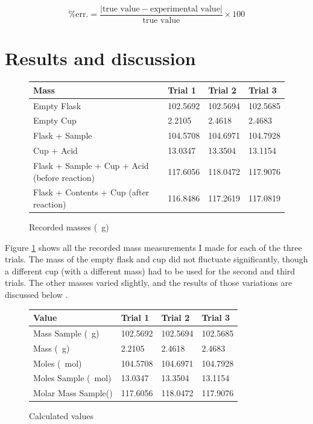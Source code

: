 \documentclass[
journal=aamick,
manuscript=article]{achemso}
\begin{document}
\begin{equation}
  \text{\%err.} =
  \frac{|\text{true value}-\text{experimental value}|}{\text{true value}}
  \times 100
  \label{eq:error}
\end{equation}


\section{Results and discussion}
\begin{figure}
    \begin{tabular}{|l|l|l|l|}
        \hline
	         \textbf{Mass} &  \textbf{Trial 1} &  \textbf{Trial 2} &  \textbf{Trial 3}\\
        \hline
	        Empty Flask & 102.5692 & 102.5694 & 102.5685\\
        \hline
	        Empty Cup & 2.2105 & 2.4618 & 2.4683\\
        \hline
	        Flask + Sample & 104.5708 & 104.6971 & 104.7928\\
        \hline
	        Cup + Acid & 13.0347 & 13.3504 & 13.1154\\
        \hline
	        Flask + Sample + Cup + Acid (before reaction) & 117.6056 & 118.0472 & 117.9076\\
        \hline
	        Flask + Contents + Cup (after reaction) & 116.8486 & 117.2619 & 117.0819\\
        \hline
    \end{tabular}
    \caption{Recorded masses (\SI{}{\gram})}
    \label{tab:data}
\end{figure}

Figure \ref{tab:data} shows all the recorded mass measurements I made for each of the three trials. The mass of the empty flask and cup did not fluctuate significantly, though a different cup (with a different mass) had to be used for the second and third trials. The other masses varied slightly, and the results of those variations are discussed below \cite{k}.

\begin{figure}
    \begin{tabular}{|l|l|l|l|}
        \hline
	         \textbf{Value} &  \textbf{Trial 1} &  \textbf{Trial 2} &  \textbf{Trial 3}\\
        \hline
	        Mass Sample (\SI{}{\gram}) & 102.5692 & 102.5694 & 102.5685\\
        \hline
	        Mass \ce{CO2} (\SI{}{\gram}) & 2.2105 & 2.4618 & 2.4683\\
        \hline
	        Moles \ce{CO2} (\SI{}{\mole}) & 104.5708 & 104.6971 & 104.7928\\
        \hline
	        Moles Sample (\SI{}{\mole}) & 13.0347 & 13.3504 & 13.1154\\
        \hline
	        Molar Mass Sample(\SI{}{\Molar})& 117.6056 & 118.0472 & 117.9076\\
        \hline
    \end{tabular}
    \caption{Calculated values}
    \label{tab:calculations}
\end{figure}
\end{document}
